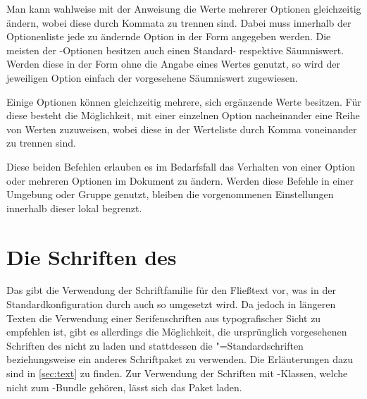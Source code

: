 \begin{DeclareEntity*}{}
\begin{DeclareEntity*}{}
\begin{DeclareEntity*}{}
\begin{Declaration}
\begin{Declaration}
Man kann wahlweise mit der Anweisung  die Werte mehrerer 
Optionen gleichzeitig ändern, wobei diese durch Kommata zu trennen sind. Dabei 
muss innerhalb der Optionenliste jede zu ändernde Option in der Form 
\PValue{=} angegeben werden. Die meisten der 
\TUDScript-Optionen besitzen auch einen Standard- respektive Säumniswert. 
Werden diese in der Form  ohne die Angabe eines Wertes genutzt, 
so wird der jeweiligen Option einfach der vorgesehene Säumniswert zugewiesen.

Einige Optionen können gleichzeitig mehrere, sich ergänzende Werte besitzen. 
Für diese besteht die Möglichkeit, mit  einer einzelnen Option 
nacheinander eine Reihe von Werten zuzuweisen, wobei diese in der Werteliste 
durch Komma voneinander zu trennen sind.

Diese beiden Befehlen erlauben es im Bedarfsfall das Verhalten von einer Option 
oder mehreren Optionen im Dokument zu ändern. Werden diese Befehle in einer 
Umgebung oder Gruppe genutzt, bleiben die vorgenommenen Einstellungen innerhalb 
dieser lokal begrenzt.
\end{Declaration}
\end{Declaration}



\section{%
  Die Schriften des \CDs%
  \label{sec:fonts}%
}

%
Das \TUDCD gibt die Verwendung der Schriftfamilie \OpenSans für den Fließtext 
vor, was in der Standardkonfiguration durch \TUDScript auch so umgesetzt wird. 
Da jedoch in längeren Texten die Verwendung einer Serifenschriften aus 
typografischer Sicht zu empfehlen ist, gibt es allerdings die Möglichkeit, die 
ursprünglich vorgesehenen Schriften des \CDs nicht zu laden und stattdessen die 
"=Standardschriften beziehungsweise ein anderes Schriftpaket 
zu verwenden. Die Erläuterungen dazu sind in \autoref{sec:text} zu finden. Zur 
Verwendung der Schriften mit -Klassen, welche nicht zum 
\TUDScript-Bundle gehören, lässt sich das Paket  laden.


\end{DeclareEntity*}
\end{DeclareEntity*}
\end{DeclareEntity*}
